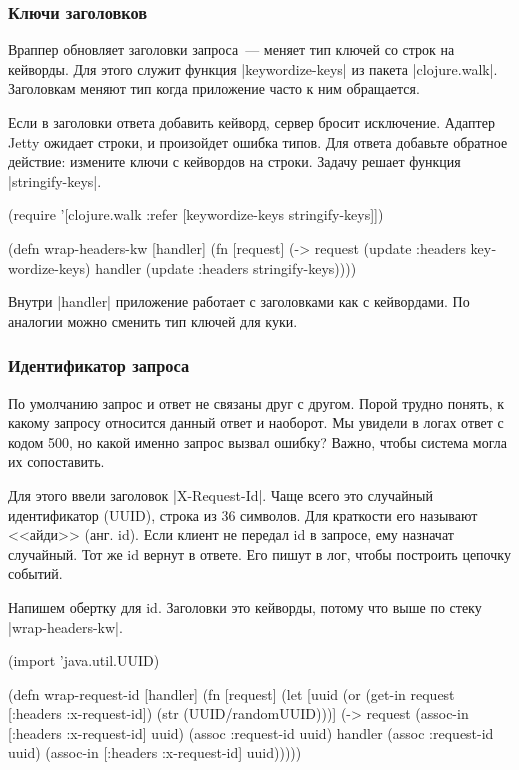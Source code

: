 \subsubsection*{Ключи заголовков}

Враппер обновляет заголовки запроса~--- меняет тип ключей со строк на
кейворды. Для этого служит функция \spverb|keywordize-keys| из пакета
\spverb|clojure.walk|. Заголовкам меняют тип когда приложение часто к ним
обращается.

Если в заголовки ответа добавить кейворд, сервер бросит исключение. Адаптер
Jetty ожидает строки, и произойдет ошибка типов. Для ответа добавьте обратное
действие: измените ключи с кейвордов на строки. Задачу решает функция
\spverb|stringify-keys|.

\begin{english}
  \begin{clojure}
(require '[clojure.walk :refer
           [keywordize-keys stringify-keys]])

(defn wrap-headers-kw [handler]
  (fn [request]
    (-> request
        (update :headers keywordize-keys)
        handler
        (update :headers stringify-keys))))
  \end{clojure}
\end{english}

Внутри \spverb|handler| приложение работает с заголовками как с кейвордами. По
аналогии можно сменить тип ключей для куки.

\subsubsection*{Идентификатор запроса}

По умолчанию запрос и ответ не связаны друг с другом. Порой трудно понять, к
какому запросу относится данный ответ и наоборот. Мы увидели в логах ответ с
кодом 500, но какой именно запрос вызвал ошибку? Важно, чтобы система могла их
сопоставить.

Для этого ввели заголовок \spverb|X-Request-Id|. Чаще всего это случайный
идентификатор (UUID), строка из 36 символов. Для краткости его называют <<айди>>
(анг. id). Если клиент не передал id в запросе, ему назначат случайный. Тот же
id вернут в ответе. Его пишут в лог, чтобы построить цепочку событий.

Напишем обертку для id. Заголовки это кейворды, потому что выше по стеку
\spverb|wrap-headers-kw|.

\begin{english}
  \begin{clojure}
(import 'java.util.UUID)

(defn wrap-request-id [handler]
  (fn [request]
    (let [uuid (or (get-in request [:headers :x-request-id])
                   (str (UUID/randomUUID)))]
      (-> request
          (assoc-in [:headers :x-request-id] uuid)
          (assoc :request-id uuid)
          handler
          (assoc :request-id uuid)
          (assoc-in [:headers :x-request-id] uuid)))))
  \end{clojure}
\end{english}

